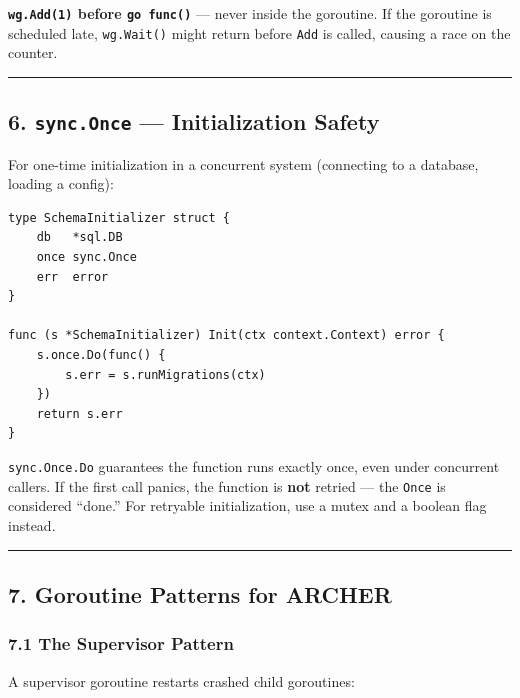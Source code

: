 \documentclass[11pt,a4paper,oneside]{book}
\begin{document}
\textbf{\texttt{wg.Add(1)} before \texttt{go\ func()}} --- never inside
the goroutine. If the goroutine is scheduled late, \texttt{wg.Wait()}
might return before \texttt{Add} is called, causing a race on the
counter.

\begin{center}\rule{0.5\linewidth}{0.5pt}\end{center}

\subsection{\texorpdfstring{6. \texttt{sync.Once} --- Initialization
Safety}{6. sync.Once --- Initialization Safety}}

For one-time initialization in a concurrent system (connecting to a
database, loading a config):

\begin{verbatim}
type SchemaInitializer struct {
    db   *sql.DB
    once sync.Once
    err  error
}

func (s *SchemaInitializer) Init(ctx context.Context) error {
    s.once.Do(func() {
        s.err = s.runMigrations(ctx)
    })
    return s.err
}
\end{verbatim}

\texttt{sync.Once.Do} guarantees the function runs exactly once, even
under concurrent callers. If the first call panics, the function is
\textbf{not} retried --- the \texttt{Once} is considered ``done.'' For
retryable initialization, use a mutex and a boolean flag instead.

\begin{center}\rule{0.5\linewidth}{0.5pt}\end{center}

\subsection{7. Goroutine Patterns for
ARCHER}

\subsubsection{7.1 The Supervisor
Pattern}

A supervisor goroutine restarts crashed child goroutines:
\end{document}
